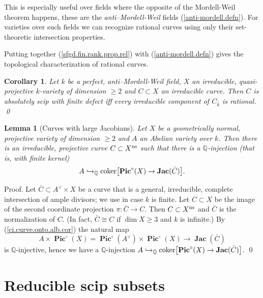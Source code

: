 \documentclass{amsart}
\newtheorem{lem}[thm]{Lemma}
\newtheorem{cor}[thm]{Corollary}
\theoremstyle{definition}
\theoremstyle{remark}
\newcommand{\q}[0]{{\mathbb Q}}
\newcommand{\pico}[0]{\operatorname{\mathbf{Pic}}^{\circ}}
\newcommand{\coker}[0]{\operatorname{coker}}
\newcommand{\jacs}[0]{\operatorname{\mathbf{Jac}}}
\def\into{\DOTSB\lhook\joinrel\to}
\begin{document}
 
This is especially useful over  fields where the opposite of the Mordell-Weil theorem  happens, these are the  {\it anti--Mordell-Weil} fields  (\ref{anti-mordell.defn}).
For varieties over such fields we can recognize rational curves 
using only their set-theoretic intersection properties.









Putting together (\ref{sfgd.fin.rank.prop.rel})  with (\ref{anti-mordell.defn}) gives the topological characterization of rational curves.

\begin{cor}\label{ci.char.thm.char0.rel} 
 Let $k$ be a perfect,   anti--Mordell-Weil field, 
 $X$ an irreducible, quasi-projective $k$-variety of dimension $\geq 2$ and  $C\subset X$   an irreducible   curve. Then $C$ is absolutely  scip  with finite  defect iff  every irreducible component of $C_{\bar k}$ is rational. \qed
\end{cor}





\begin{lem}[Curves with large Jacobians]\label{coker.any.quot}  Let $X$ be a geometrically normal, projective variety of dimension $\geq 2$  and  $A$  an Abelian variety over $k$.
Then there is an  irreducible,  projective curve $C\subset  X^{\rm ns}$ such that there is a  $\q$-injection  (that is, with finite kernel)
$$
A\into_{\q}  \coker\bigl[ \pico(X)\to \jacs(\bar C)\bigr].
$$
\end{lem}



Proof. 
Let $\bar C\subset A^\vee\times X$ be a curve that is a general, irreducible, complete intersection of
ample divisors; we use \cite{MR2385639} in case $k$ is finite. Let   $C\subset X$ be the image of the    second coordinate projection $\pi:\bar C\to C$. Then $C\subset X^{\rm ns}$ and $\bar C$ is the normalization of $C$. (In fact, $\bar C\cong C$ if $\dim X\geq 3$ and $k$ is infinite.)
By (\ref{ci.curve.onto.alb.cor})  the natural map
 $$
 A\times \pico(X) = \pico(A^\vee)\times \pico(X) \to \jacs(\bar C)
$$ is $\q$-injective, hence  
 we have a $\q$-injection
$A\into_{\q}  \coker\bigl[ \pico(X)\to \jacs(\bar C)\bigr]$.  \qed
\medskip




\section{Reducible scip subsets}\label{red.scip.sec}
\end{document}
